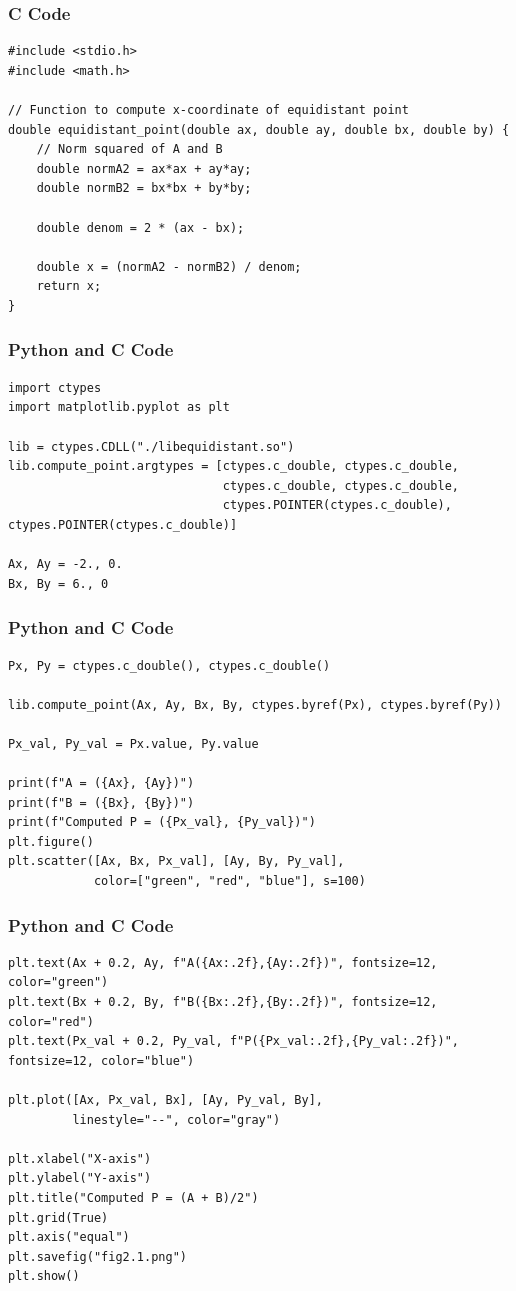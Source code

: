 \documentclass{beamer}
\begin{document}
\begin{frame}[fragile]
\frametitle{C Code}
\begin{lstlisting}
#include <stdio.h>
#include <math.h>

// Function to compute x-coordinate of equidistant point
double equidistant_point(double ax, double ay, double bx, double by) {
    // Norm squared of A and B
    double normA2 = ax*ax + ay*ay;
    double normB2 = bx*bx + by*by;

    double denom = 2 * (ax - bx);

    double x = (normA2 - normB2) / denom;
    return x;
}
\end{lstlisting}

\end{frame}

\begin{frame}[fragile]
\frametitle{Python and C Code}

\begin{lstlisting}
import ctypes
import matplotlib.pyplot as plt

lib = ctypes.CDLL("./libequidistant.so")
lib.compute_point.argtypes = [ctypes.c_double, ctypes.c_double,
                              ctypes.c_double, ctypes.c_double,
                              ctypes.POINTER(ctypes.c_double), ctypes.POINTER(ctypes.c_double)]

Ax, Ay = -2., 0.
Bx, By = 6., 0
\end{lstlisting}

\end{frame}
\begin{frame}[fragile]
\frametitle{Python and C Code}

\begin{lstlisting}
Px, Py = ctypes.c_double(), ctypes.c_double()

lib.compute_point(Ax, Ay, Bx, By, ctypes.byref(Px), ctypes.byref(Py))

Px_val, Py_val = Px.value, Py.value

print(f"A = ({Ax}, {Ay})")
print(f"B = ({Bx}, {By})")
print(f"Computed P = ({Px_val}, {Py_val})")
plt.figure()
plt.scatter([Ax, Bx, Px_val], [Ay, By, Py_val],
            color=["green", "red", "blue"], s=100)

\end{lstlisting}
\end{frame}

\begin{frame}[fragile]
\frametitle{Python and C Code}
\begin{lstlisting}
plt.text(Ax + 0.2, Ay, f"A({Ax:.2f},{Ay:.2f})", fontsize=12, color="green")
plt.text(Bx + 0.2, By, f"B({Bx:.2f},{By:.2f})", fontsize=12, color="red")
plt.text(Px_val + 0.2, Py_val, f"P({Px_val:.2f},{Py_val:.2f})", fontsize=12, color="blue")

plt.plot([Ax, Px_val, Bx], [Ay, Py_val, By],
         linestyle="--", color="gray")

plt.xlabel("X-axis")
plt.ylabel("Y-axis")
plt.title("Computed P = (A + B)/2")
plt.grid(True)
plt.axis("equal")
plt.savefig("fig2.1.png") 
plt.show()
\end{lstlisting}
\end{frame}
\end{document}
